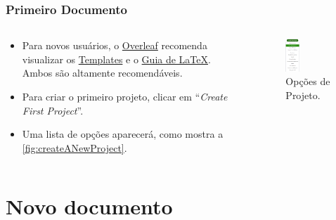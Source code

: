 \documentclass[brazilian]{beamer}
\begin{document}
\begin{frame}
    \frametitle{Primeiro Documento}
    \begin{columns}
        \begin{column}{0.5\textwidth}
            \begin{itemize}
                \item Para novos usuários, o \href{https://www.overleaf.com/}{Overleaf} recomenda visualizar os \href{https://www.overleaf.com/latex/templates}{Templates} e o \href{https://www.overleaf.com/learn}{Guia de \LaTeX}. Ambos são altamente recomendáveis.
                \item Para criar o primeiro projeto, clicar em ``\textit{Create First Project}''.
                \item Uma lista de opções aparecerá, como mostra a \autoref{fig:createANewProject}.
            \end{itemize}
        \end{column}
        \begin{column}{0.5\textwidth}
            \begin{figure}
                \centering
                \caption{Opções de Projeto.}
                \label{fig:createANewProject}
                \includegraphics[width=0.3\textwidth]{../images/createANewProject.png}
            \end{figure}
        \end{column}
    \end{columns}
\end{frame}

\section{Novo documento}
\end{document}
